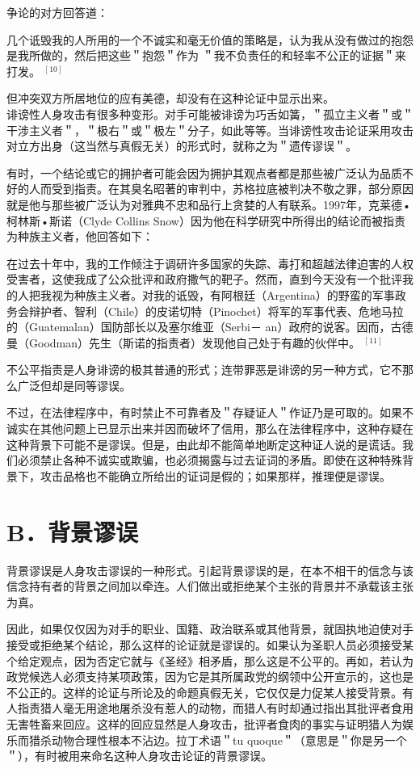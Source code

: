争论的对方回答道：

几个诋毁我的人所用的一个不诚实和毫无价值的策略是，认为我从没有做过的抱怨是我所做的，然后把这些＂抱怨＂作为 ＂我不负责任的和轻率不公正的证据＂来打发。 ${ }^{[10]}$

但冲突双方所居地位的应有美德，却没有在这种论证中显示出来。\\
诽谤性人身攻击有很多种变形。对手可能被诽谤为巧舌如簧，＂孤立主义者＂或＂干涉主义者＂，＂极右＂或＂极左＂分子，如此等等。当诽谤性攻击论证采用攻击对立方出身（这当然与真假无关）的形式时，就称之为＂遗传谬误＂。

有时，一个结论或它的拥护者可能会因为拥护其观点者都是那些被广泛认为品质不好的人而受到指责。在其臭名昭著的审判中，苏格拉底被判决不敬之罪，部分原因就是他与那些被广泛认为对雅典不忠和品行上贪婪的人有联系。1997年，克莱德•柯林斯•斯诺（Clyde Collins Snow）因为他在科学研究中所得出的结论而被指责为种族主义者，他回答如下：

\begin{displayquote}
在过去十年中，我的工作倾注于调研许多国家的失踪、毒打和超越法律迫害的人权受害者，这使我成了公众批评和政府撒气的靶子。然而，直到今天没有一个批评我的人把我视为种族主义者。对我的诋毁，有阿根廷（Argentina）的野蛮的军事政务会辩护者、智利（Chile）的皮诺切特（Pinochet）将军的军事代表、危地马拉的（Guatemalan）国防部长以及塞尔维亚（Serbi－ an）政府的说客。因而，古德曼（Goodman）先生（斯诺的指责者）发现他自己处于有趣的伙伴中。 ${ }^{[11]}$
\end{displayquote}

不公平指责是人身诽谤的极其普通的形式；连带罪恶是诽谤的另一种方式，它不那么广泛但却是同等谬误。

不过，在法律程序中，有时禁止不可靠者及＂存疑证人＂作证乃是可取的。如果不诚实在其他问题上已显示出来并因而破坏了信用，那么在法律程序中，这种存疑在这种背景下可能不是谬误。但是，由此却不能简单地断定这种证人说的是谎话。我们必须禁止各种不诚实或欺骗，也必须揭露与过去证词的矛盾。即使在这种特殊背景下，攻击品格也不能确立所给出的证词是假的；如果那样，推理便是谬误。

\section*{B．背景谬误}
背景谬误是人身攻击谬误的一种形式。引起背景谬误的是，在本不相干的信念与该信念持有者的背景之间加以牵连。人们做出或拒绝某个主张的背景并不承载该主张为真。

因此，如果仅仅因为对手的职业、国籍、政治联系或其他背景，就固执地迫使对手接受或拒绝某个结论，那么这样的论证就是谬误的。如果认为圣职人员必须接受某个给定观点，因为否定它就与《圣经》相矛盾，那么这是不公平的。再如，若认为政党候选人必须支持某项政策，因为它是其所属政党的纲领中公开宣示的，这也是不公正的。这样的论证与所论及的命题真假无关，它仅仅是力促某人接受背景。有人指责猎人毫无用途地屠杀没有惹人的动物，而猎人有时却通过指出其批评者食用无害牲畜来回应。这样的回应显然是人身攻击，批评者食肉的事实与证明猎人为娱乐而猎杀动物合理性根本不沾边。拉丁术语＂tu quoque＂（意思是＂你是另一个＂），有时被用来命名这种人身攻击论证的背景谬误。

